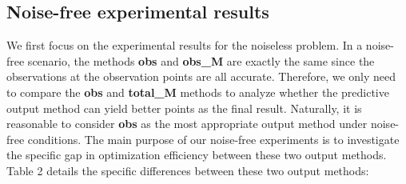 \documentclass{article}
\begin{document}
  \subsection{Noise-free experimental results}
  \hspace{2em}We first focus on the experimental results for the noiseless problem. In a noise-free scenario, the methods \textbf{obs} and \textbf{obs\_M} are exactly the same since the observations at the observation points are all accurate. Therefore, we only need to compare the \textbf{obs} and \textbf{total\_M} methods to analyze whether the predictive output method can yield better points as the final result. Naturally, it is reasonable to consider \textbf{obs} as the most appropriate output method under noise-free conditions. The main purpose of our noise-free experiments is to investigate the specific gap in optimization efficiency between these two output methods. Table 2 details the specific differences between these two output methods:
\end{document}
